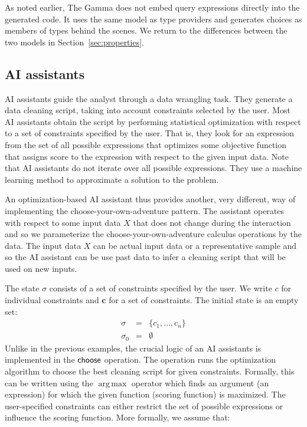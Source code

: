 \documentclass[a4paper,UKenglish,cleveref, autoref, thm-restate]{lipics-v2021}
\newcommand{\ident}[1]{\textsf{#1}}
\newcommand{\sigmaN}{\sigma_0}
\newcommand{\select}{\textnormal{\ident{choose}}}
\DeclareMathOperator{\argmax}{arg\,max}
\begin{document}
As noted earlier, The Gamma does not embed query expressions directly into the generated code.
It uses the same model as type providers and generates choices as members of
types behind the scenes. We return to the differences between the two models in
Section~\ref{sec:properties}.

\subsection{AI assistants}
\label{sec:examples-aias}

AI assistants guide the analyst through a data wrangling task. They
generate a data cleaning script, taking into account constraints selected by the user.
Most AI assistants obtain the script by performing statistical optimization with respect
to a set of constraints specified by the user. That is, they look for an expression from the
set of all possible expressions that optimizes some objective function that assigns score to
the expression with respect to the given input data. Note that AI assistants do not iterate
over all possible expressions. They use a machine learning method to approximate a solution
to the problem.

An optimization-based AI assistant \cite{petricek-2023-aias} thus provides another, very
different, way of implementing the choose-your-own-adventure pattern. The assistant operates
with respect to some input data $X$ that does not change during the interaction and so we
parameterize the choose-your-own-adventure calculus operations by the data.
The input data $X$ can be actual input data or a representative sample and so the AI assistant
can be use past data to infer a cleaning script that will be used on new inputs.

The state $\sigma$ consists of a set of constraints specified by the user. We write
$c$ for individual constraints and $\boldsymbol{c}$ for a set of constraints. The initial
state is an empty set:
\[
\begin{array}{rcl}
\sigma &=& \{ c_1, \ldots, c_n \}\\
\sigmaN &=& \emptyset
\end{array}
\]
Unlike in the previous examples, the crucial logic of an AI assistants is implemented in the
$\select$ operation. The operation runs the optimization algorithm to choose the best cleaning
script for given constraints. Formally, this can be written using the $\argmax$ operator which
finds an argument (an expression) for which the given function (scoring function) is maximized.
The user-specified constraints can either restrict the set of possible expressions or influence
the scoring function. More formally, we assume that:
\end{document}
